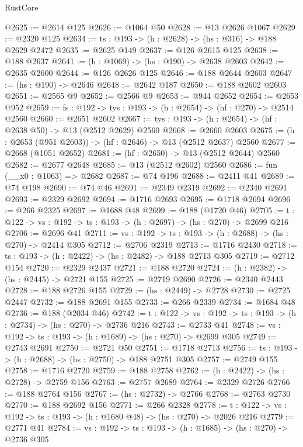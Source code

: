 \begin{lexlean}{RustCore}
\begin{coremodule}
@2625 := @2614 @125
@2626 := @1064 @50
@2628 := @13 @2626 @1067
@2629 := @2320 @125
@2634 := {ts : @193} -> (h : @2628) -> (hs : @316) -> @188 @2629 @2472
@2635 := @2625 @149
@2637 := @126 @2615 @125
@2638 := @188 @2637
@2641 := (h : @1069) -> (hs : @190) -> @2638 @2603
@2642 := @2635 @2600
@2644 := @126 @2626 @125
@2646 := @188 @2644 @2603
@2647 := (hs : @190) -> @2646
@2648 := @2642 @187
@2650 := @188 @2602 @2603
@2651 := @2565 @9
@2652 := @2566 @9
@2653 := @944 @2652
@2654 := @2653 @952
@2659 := {fs : @192} -> {tys : @193} -> (h : @2654) -> (hf : @270) -> @2514 @2560
@2660 := @2651 @2602
@2667 := {tys : @193} -> (h : @2654) -> (hf : @2638 @50) -> @13 (@2512 @2629) @2560
@2668 := @2660 @2603
@2675 := (h : @2653 (@951 @2603)) -> (hf : @2646) -> @13 (@2512 @2637) @2560
@2677 := @2668 (@1051 @2652)
@2681 := (hf : @2650) -> @13 (@2512 @2644) @2560
@2682 := @2677 @2648
@2685 := @13 (@2512 @2602) @2560
@2686 := fun (__x0 : @1063) => @2682
@2687 := @74 @196
@2688 := @2411 @41
@2689 := @74 @198
@2690 := @74 @46
@2691 := @2349 @2319
@2692 := @2340 @2691
@2693 := @2329 @2692
@2694 := @1716 @2693
@2695 := @1718 @2694
@2696 := @266 @2325
@2697 := @1688 @48
@2699 := @188 (@1720 @46)
@2705 := {t : @122} -> {vs : @192} -> {ts : @193} -> (h : @2697) -> (hs : @270) -> @2699 @216
@2706 := @2696 @41
@2711 := {vs : @192} -> {ts : @193} -> (h : @2688) -> (hs : @270) -> @2414 @305
@2712 := @2706 @2319
@2713 := @1716 @2430
@2718 := {ts : @193} -> (h : @2422) -> (hs : @2482) -> @188 @2713 @305
@2719 := @2712 @154
@2720 := @2329 @2437
@2721 := @188 @2720
@2724 := (h : @2382) -> (hs : @2445) -> @2721 @155
@2725 := @2719 @2690
@2726 := @2340 @2443
@2728 := @188 @2726 @155
@2729 := (hs : @2449) -> @2728
@2730 := @2725 @2447
@2732 := @188 @2691 @155
@2733 := @266 @2339
@2734 := @1684 @48
@2736 := @188 (@2034 @46)
@2742 := {t : @122} -> {vs : @192} -> {ts : @193} -> (h : @2734) -> (hs : @270) -> @2736 @216
@2743 := @2733 @41
@2748 := {vs : @192} -> {ts : @193} -> (h : @1689) -> (hs : @270) -> @2699 @305
@2749 := @2743 @2691
@2750 := @2721 @50
@2751 := @1718 @2713
@2756 := {ts : @193} -> (h : @2688) -> (hs : @2750) -> @188 @2751 @305
@2757 := @2749 @155
@2758 := @1716 @2720
@2759 := @188 @2758
@2762 := (h : @2422) -> (hs : @2728) -> @2759 @156
@2763 := @2757 @2689
@2764 := @2329 @2726
@2766 := @188 @2764 @156
@2767 := (hs : @2732) -> @2766
@2768 := @2763 @2730
@2770 := @188 @2692 @156
@2771 := @266 @2328
@2778 := {t : @122} -> {vs : @192} -> {ts : @193} -> (h : @1680 @48) -> (hs : @270) -> @2026 @216
@2779 := @2771 @41
@2784 := {vs : @192} -> {ts : @193} -> (h : @1685) -> (hs : @270) -> @2736 @305

\end{coremodule}
\end{lexlean}
